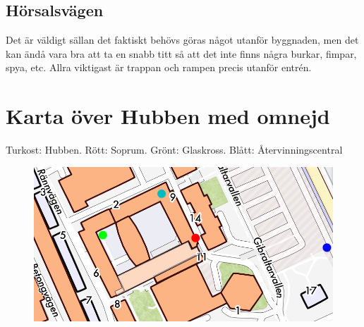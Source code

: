 \subsection{Hörsalsvägen}
Det är väldigt sällan det faktiskt behövs göras något utanför byggnaden, men det kan ändå vara bra att ta en snabb titt så att det inte finns några burkar, fimpar, spya, etc. Allra viktigast är trappan och rampen precis utanför entrén.

\newpage
\section{Karta över Hubben med omnejd}
Turkost: Hubben. Rött: Soprum. Grönt: Glaskross. Blått: Återvinningscentral
\begin{figure}[h]
    \centering
    \includegraphics[scale=0.5, angle=90]{map}
    \label{fig:map}
\end{figure}
